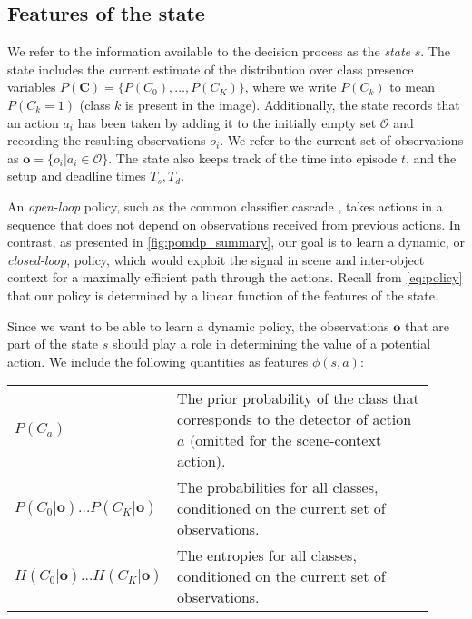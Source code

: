 \subsection{Features of the state}\label{sec:det_features}

We refer to the information available to the decision process as the \emph{state} $s$.
The state includes the current estimate of the distribution over class presence variables $P(\mathbf{C}) = \{P(C_0), \ldots, P(C_K)\}$, where we write $P(C_k)$ to mean $P(C_k=1)$ (class $k$ is present in the image).
Additionally, the state records that an action $a_i$ has been taken by adding it to the initially empty set $\mathcal{O}$ and recording the resulting observations $o_i$.
We refer to the current set of observations as $\mathbf{o} = \{o_i | a_i \in \mathcal{O}\}$.
The state also keeps track of the time into episode $t$, and the setup and deadline times $T_s,T_d$.

An \emph{open-loop} policy, such as the common classifier cascade \parencite{Viola-IJCV-2004}, takes actions in a sequence that does not depend on observations received from previous actions.
In contrast, as presented in \autoref{fig:pomdp_summary}, our goal is to learn a dynamic, or \emph{closed-loop}, policy, which would exploit the signal in scene and inter-object context for a maximally efficient path through the actions.
Recall from \autoref{eq:policy} that our policy is determined by a linear function of the features of the state.

Since we want to be able to learn a dynamic policy, the observations $\mathbf{o}$ that are part of the state $s$ should play a role in determining the value of a potential action.
We include the following quantities as features $\phi(s,a)$:

\begin{tabularx}{0.8\linewidth}{p{0.23\linewidth}p{0.69\linewidth}}
$P(C_a)$ & The prior probability of the class that corresponds to the detector of action $a$ (omitted for the scene-context action).\\
$P(C_0|\mathbf{o}) \ldots P(C_K|\mathbf{o})$ & The probabilities for all classes, conditioned on the current set of observations.\\
$H(C_0|\mathbf{o}) \ldots H(C_K|\mathbf{o})$ & The entropies for all classes, conditioned on the current set of observations. \\
\end{tabularx}

